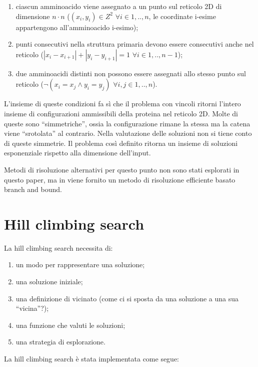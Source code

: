 \documentclass[conference]{IEEEtran}
\newcommand{\abs}[1]{\left|#1\right|}
\begin{document}
\begin{enumerate}
 \item ciascun amminoacido viene assegnato a un punto sul reticolo 2D di dimensione $n \cdot n$ ($(x_i, y_i) \in Z^2$ $\forall i \in 1,..,n$, le coordinate i-esime appartengono all'amminoacido i-esimo);
 \item punti consecutivi nella struttura primaria devono essere consecutivi anche nel reticolo ($\abs{x_i - x_{i+1}} + \abs{y_i - y_{i+1}} = 1 $ $\forall i \in 1,..,n-1$);
 \item due amminoacidi distinti non possono essere assegnati allo stesso punto sul reticolo ($ \neg (x_i = x_j \land y_i = y_j)$ $\forall i,j \in 1,..,n$).
\end{enumerate}

L'insieme di queste condizioni fa sì che il problema con vincoli ritorni l'intero insieme di configurazioni ammissibili della proteina nel reticolo 2D. Molte di queste sono ``simmetriche'', ossia la configurazione rimane la stessa ma la catena viene ``srotolata'' al contrario. Nella valutazione delle soluzioni non si tiene conto di queste simmetrie. Il problema così definito ritorna un insieme di soluzioni esponenziale rispetto alla dimensione dell'input.

Metodi di risoluzione alternativi per questo punto non sono stati esplorati in questo paper, ma in \cite{BranchBound} viene fornito un metodo di risoluzione efficiente basato branch and bound.

\section{Hill climbing search}

La hill climbing search necessita di:

\begin{enumerate}
 \item un modo per rappresentare una soluzione;
 \item una soluzione iniziale;
 \item una definizione di vicinato (come ci si sposta da una soluzione a una sua ``vicina''?);
 \item una funzione che valuti le soluzioni;
 \item una strategia di esplorazione.
\end{enumerate}

La hill climbing search è stata implementata come segue:
\end{document}
